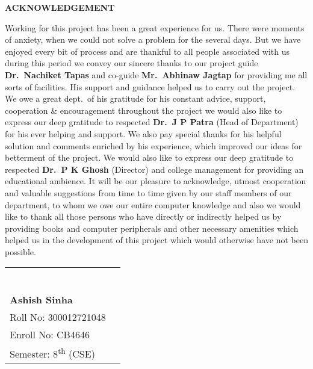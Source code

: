 
\vspace{-0.5cm}

\begin{center}
  \Large\textbf{ACKNOWLEDGEMENT}
\end{center}
\vspace{-0.5cm}
\begin{justify}
  \linespread{1.5}
  \normalsize
  Working for this project has been a great experience for us. There were moments of anxiety, when we could not solve a problem for the several days. But we have enjoyed every bit of process and are thankful to all people associated with us during this period we convey our sincere thanks to our project guide \textbf{Dr.\ Nachiket Tapas} and co-guide \textbf{Mr.\ Abhinaw Jagtap} for providing me all sorts of facilities. His support and guidance helped us to carry out the project. We owe a great dept.\ of his gratitude for his constant advice, support, cooperation \& encouragement throughout the project we would also like to express our deep gratitude to respected \textbf{Dr.\ J P Patra} (Head of Department) for his ever helping and support. We also pay special thanks for his helpful solution and comments enriched by his experience, which improved our ideas for betterment of the project. We would also like to express our deep gratitude to respected \textbf{Dr.\ P K Ghosh} (Director) and college management for providing an educational ambience. It will be our pleasure to acknowledge, utmost cooperation and valuable suggestions from time to time given by our staff members of our department, to whom we owe our entire computer knowledge and also we would like to thank all those persons who have directly or indirectly helped us by providing books and computer peripherals and other necessary amenities which helped us in the development of this project which would otherwise have not been possible.
\end{justify}



\vspace{0.5cm}
\normalsize

\noindent
\begin{tabular}{p{} @{\hspace{2cm}} p{}}
   &
  \centering
  \rule{4cm}{0.4pt}     \\
  \textbf{Ashish Sinha} \\
  Roll No: 300012721048 \\
  Enroll No: CB4646     \\
  Semester: 8\textsuperscript{th} (CSE)
\end{tabular}

